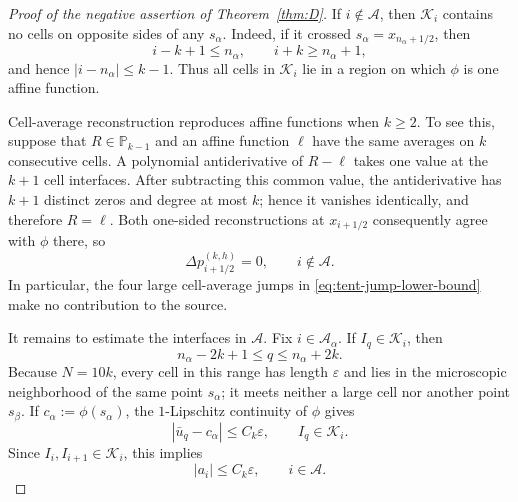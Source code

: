 \documentclass[11pt]{amsart}
\theoremstyle{plain}
\theoremstyle{definition}
\theoremstyle{remark}
\numberwithin{equation}{section}
\theoremstyle{plain}
\begin{document}
\begin{proof}[Proof of the negative assertion of
	Theorem~\ref{thm:D}]
	If $i\notin\mathcal A$, then $\mathcal K_i$ contains no cells on opposite
	sides of any $s_\alpha$.  Indeed, if it crossed
	$s_\alpha=x_{n_\alpha+1/2}$, then
	\[
	i-k+1\le n_\alpha,
	\qquad
	i+k\ge n_\alpha+1,
	\]
	and hence $|i-n_\alpha|\le k-1$.  Thus all cells in $\mathcal K_i$ lie in a
	region on which $\phi$ is one affine function.
	
	Cell-average reconstruction reproduces affine functions when $k\ge2$.  To
	see this, suppose that $R\in\mathbb P_{k-1}$ and an affine function $\ell$
	have the same averages on $k$ consecutive cells.  A polynomial
	antiderivative of $R-\ell$ takes one value at the $k+1$ cell interfaces.
	After subtracting this common value, the antiderivative has $k+1$
	distinct zeros and degree at most $k$; hence
	it vanishes identically, and therefore $R=\ell$.  Both one-sided
	reconstructions at $x_{i+1/2}$ consequently agree with $\phi$ there, so
	\begin{equation}\label{eq:reconstructed-jump-off-exceptional-set}
		\Delta p_{i+1/2}^{(k,h)}=0,
		\qquad i\notin\mathcal A.
	\end{equation}
	In particular, the four large cell-average jumps in
	\eqref{eq:tent-jump-lower-bound} make no contribution to the source.
	
	It remains to estimate the interfaces in $\mathcal A$.  Fix
	$i\in\mathcal A_\alpha$.  If $I_q\in\mathcal K_i$, then
	\begin{equation}\label{eq:exceptional-hull-index-range}
		n_\alpha-2k+1\le q\le n_\alpha+2k.
	\end{equation}
	Because $N=10k$, every cell in this range has length $\varepsilon$ and lies
	in the microscopic neighborhood of the same point $s_\alpha$; it meets
	neither a large cell nor another point $s_\beta$.  If
	$c_\alpha:=\phi(s_\alpha)$, the $1$-Lipschitz continuity of $\phi$ gives
	\begin{equation}\label{eq:microscopic-average-bound}
		|\bar u_q-c_\alpha|
		\le C_k\varepsilon,
		\qquad I_q\in\mathcal K_i.
	\end{equation}
	Since $I_i,I_{i+1}\in\mathcal K_i$, this implies
	\begin{equation}\label{eq:small-jumps-near-breakpoints}
		|a_i|\le C_k\varepsilon,
		\qquad i\in\mathcal A.
	\end{equation}
	

\end{proof}
\end{document}
